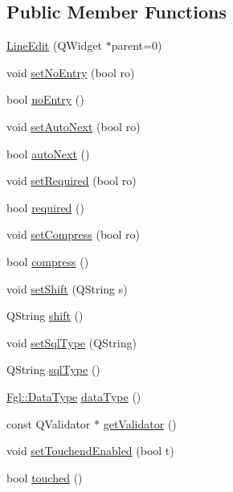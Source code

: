 \subsection*{Public Member Functions}
\begin{DoxyCompactItemize}
\item 
\hyperlink{classLineEdit_a0c54dc37150c2eea45af904a8146025a}{LineEdit} (QWidget $\ast$parent=0)
\item 
void \hyperlink{classLineEdit_a2f16adf255e3b0413579c3c689040afd}{setNoEntry} (bool ro)
\item 
bool \hyperlink{classLineEdit_aae4ac49369514ba569049214623f6dea}{noEntry} ()
\item 
void \hyperlink{classLineEdit_aee6f145415075ee47b730cbd26941f1b}{setAutoNext} (bool ro)
\item 
bool \hyperlink{classLineEdit_aca89c8a1aa943a93e68cd0a910f2331b}{autoNext} ()
\item 
void \hyperlink{classLineEdit_ac5c681c48927ade8548fd3293b614b78}{setRequired} (bool ro)
\item 
bool \hyperlink{classLineEdit_af82e35289d3464e9d161fd69cfdbbbe0}{required} ()
\item 
void \hyperlink{classLineEdit_afbe0dcdde72b9be055701f6a1bd0608b}{setCompress} (bool ro)
\item 
bool \hyperlink{classLineEdit_aac8fb7e5ef390627a71044b0ae8745bc}{compress} ()
\item 
void \hyperlink{classLineEdit_abcca038575cbc1ce186062f671763608}{setShift} (QString s)
\item 
QString \hyperlink{classLineEdit_a3d10f3933a882f6afef6383cb758191b}{shift} ()
\item 
void \hyperlink{classLineEdit_a8c0cb7cb1a2b0738db17ab3fad4b251b}{setSqlType} (QString)
\item 
QString \hyperlink{classLineEdit_afff2070683add5e2bc642cc58ae05a74}{sqlType} ()
\item 
\hyperlink{namespaceFgl_a221c9c0366d5227f8c27ca97308a691c}{Fgl::DataType} \hyperlink{classLineEdit_ac24782317d25afec4c02d74ed5892c99}{dataType} ()
\item 
const QValidator $\ast$ \hyperlink{classLineEdit_a7f6fef4035828aa9413b5d5763680adb}{getValidator} ()
\item 
void \hyperlink{classLineEdit_a52dde6d0059debb1730a029fceab64b7}{setTouchendEnabled} (bool t)
\item 
bool \hyperlink{classLineEdit_a7b733b195f9df2b7b495d030993868c6}{touched} ()
\item 

\end{DoxyCompactItemize}
